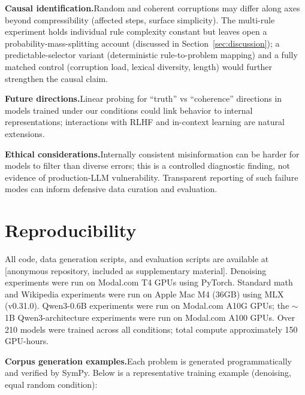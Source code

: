 \documentclass{article}
\begin{document}
\textbf{Causal identification.}\quad Random and coherent corruptions may differ along axes beyond compressibility (affected steps, surface simplicity). The multi-rule experiment holds individual rule complexity constant but leaves open a probability-mass-splitting account (discussed in Section~\ref{sec:discussion}); a predictable-selector variant (deterministic rule-to-problem mapping) and a fully matched control (corruption load, lexical diversity, length) would further strengthen the causal claim.

\textbf{Future directions.}\quad Linear probing for ``truth'' vs ``coherence'' directions in models trained under our conditions could link behavior to internal representations; interactions with RLHF and in-context learning are natural extensions.

\textbf{Ethical considerations.}\quad Internally consistent misinformation can be harder for models to filter than diverse errors; this is a controlled diagnostic finding, not evidence of production-LLM vulnerability. Transparent reporting of such failure modes can inform defensive data curation and evaluation.




\appendix

\section{Reproducibility}
\label{app:reproducibility}

All code, data generation scripts, and evaluation scripts are available at [anonymous repository, included as supplementary material]. Denoising experiments were run on Modal.com T4 GPUs using PyTorch. Standard math and Wikipedia experiments were run on Apple Mac M4 (36GB) using MLX (v0.31.0). Qwen3-0.6B experiments were run on Modal.com A10G GPUs; the ${\sim}$1B Qwen3-architecture experiments were run on Modal.com A100 GPUs. Over 210 models were trained across all conditions; total compute approximately 150 GPU-hours.

\textbf{Corpus generation examples.}\quad Each problem is generated programmatically and verified by SymPy. Below is a representative training example (denoising, equal random condition):
\end{document}
